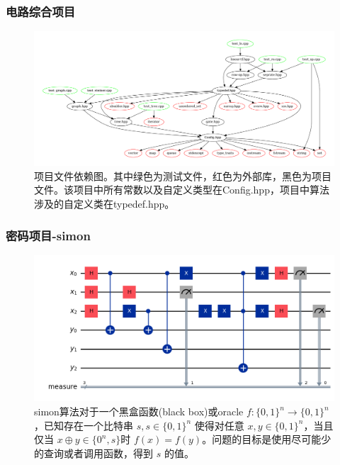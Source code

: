 \documentclass[aspectratio=1610]{beamer}
\begin{document}
\begin{frame}
    \frametitle{电路综合项目}
    \begin{figure}[htbp]
        \includegraphics[width=.8\textwidth]{dep.pdf}
        \caption{项目文件依赖图。其中绿色为测试文件，红色为外部库，黑色为项目文件。该项目中所有常数以及自定义类型在Config.hpp，项目中算法涉及的自定义类在typedef.hpp。}
    \end{figure}
\end{frame}
\begin{frame}
    \frametitle{密码项目-simon}
    \begin{figure}[htbp]
        \includegraphics[width=.8\textwidth]{simon.png}
        \caption{simon算法对于一个黑盒函数(black box)或oracle $f:\{0,1\}^n\to \{0,1\}^n$，已知存在一个比特串 $s, s\in \{0,1\}^n$ 使得对任意 $x,y\in\{0,1\}^n$，当且仅当 $x\oplus y\in \{0^n,s\}$时 $f(x) = f(y)$。问题的目标是使用尽可能少的查询或者调用函数，得到 $s$ 的值。}
    \end{figure}
\end{frame}
\end{document}
